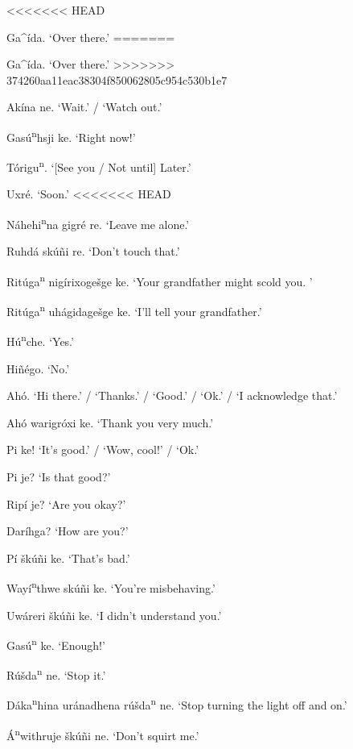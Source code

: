 \documentclass[output=paper]{LSP/langsci}
\begin{document}
\begin{figure}[p]
\begin{list}{}{} \itemsep1pt \parskip0pt 
<<<<<<< HEAD
\item{Ga\^{ }ída. `Over there.'}
=======
\item{Ga\^{ }\'ida. `Over there.'}
>>>>>>> 374260aa11eac38304f850062805c954c530b1e7
\item{Akína ne.	`Wait.' / `Watch out.'}
\item{Gas\'u\textsuperscript{n}hsji ke. `Right now!'  }
\item{Tórigu\textsuperscript{n}.	`[See you / Not until] Later.'}
\item{Uxr\'e. `Soon.'}
<<<<<<< HEAD
\item{Náhehi\textsuperscript{n}na gigr\'e re. `Leave me alone.'}
\item{Ruhdá sk\'uñi re. `Don't touch that.'}
\item{Rit\'uga\textsuperscript{n} nigírixoge\v{s}ge ke. `Your grandfather might scold you. '}
\item{Rit\'uga\textsuperscript{n} uhágidage\v{s}ge ke. `I'll tell your grandfather.'}
\item{}
\item{H\'u\textsuperscript{n}che.	`Yes.'}
\item{Hiñ\'ego. `No.'}
\item{Ahó.	`Hi there.' / `Thanks.' / `Good.' / `Ok.' / `I acknowledge that.'}
\item{Ahó warigróxi ke. `Thank you very much.'}
\item{Pi ke! `It's good.' / `Wow, cool!' / `Ok.'}
\item{Pi je? `Is that good?'}
\item{Ripí je? `Are you okay?'}
\item{Daríhga? `How are you?'}
\item{Pí \v{s}k\'uñi ke. `That's bad.'}
\item{Wayí\textsuperscript{n}thwe sk\'uñi ke. `You're misbehaving.'}
\item{Uwáreri \v{s}k\'uñi ke. `I didn't understand you.'}
\item{Gas\'u\textsuperscript{n} ke. `Enough!'}
\item{R\'u\v{s}da\textsuperscript{n} ne. `Stop it.'}
\item{Dáka\textsuperscript{n}hina uránadhena r\'u\v{s}da\textsuperscript{n} ne. `Stop turning the light off and on.'}
\item{\'A\textsuperscript{n}withruje šk\'uñi ne. `Don't squirt me.'}

\end{list}
\end{figure}
\end{document}

